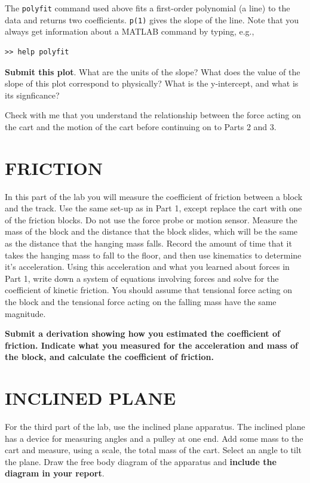 \documentclass[11pt,letterpaper]{article}
\begin{document}
The \verb+polyfit+ command used above fits a first-order polynomial (a line) to the data and returns two coefficients. \verb+p(1)+ gives the slope of the line. Note that you always get information about a MATLAB command by typing, e.g., 
\begin{verbatim}>> help polyfit\end{verbatim}

 \textbf{Submit this plot}.  What are the units of the slope?  What does the value of the slope of this plot correspond to physically? What is the y-intercept, and what is its signficance?

Check with me that you understand the relationship between the force acting on the cart and the motion of the cart before continuing on to Parts 2 and 3.

\section{FRICTION}
In this part of the lab you will measure the coefficient of friction between a block and the track. Use the same set-up as in Part 1, except replace the cart with one of the friction blocks. Do not use the force probe or motion sensor. Measure the mass of the block and the distance that the block slides, which will be the same as the distance that the hanging mass falls. Record the amount of time that it takes the hanging mass to fall to the floor, and then use kinematics to determine it's acceleration. Using this acceleration and what you learned about forces in Part 1, write down a system of equations involving forces and solve for the coefficient of kinetic friction. You should assume that tensional force acting on the block and the tensional force acting on the falling mass have the same magnitude.

\textbf{Submit a derivation showing how you estimated the coefficient of friction. Indicate what you measured for the acceleration and mass of the block, and calculate the coefficient of friction.} 

\section{INCLINED PLANE}
For the third part of the lab, use the inclined plane apparatus.  The inclined plane has a device for measuring angles and a pulley at one end. Add some mass to the cart and measure, using a scale, the total mass of the cart. Select an angle to tilt the plane.  Draw the free body diagram of the apparatus and \textbf{include the diagram in your report}.
\end{document}
